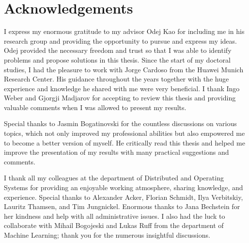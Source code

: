 

\bigskip


\begingroup

\let\clearpage\relax
\let\cleardoublepage\relax
\let\cleardoublepage\relax

\chapter*{Acknowledgements}
I express my enormous gratitude to my advisor Odej Kao for including me in his research group and providing the opportunity to pursue and express my ideas. Odej provided the necessary freedom and trust so that I was able to identify problems and propose solutions in this thesis. Since the start of my doctoral studies, I had the pleasure to work with Jorge Cardoso from the Huawei Munich Research Center. His guidance throughout the years together with the huge experience and knowledge he shared with me were very beneficial. I thank Ingo Weber and Gjorgji Madjarov for accepting to review this thesis and providing valuable comments when I was allowed to present my results.

\bigskip

Special thanks to Jasmin Bogatinovski for the countless discussions on various topics, which not only improved my professional abilities but also empowered me to become a better version of myself. He critically read this thesis and helped me improve the presentation of my results with many practical suggestions and comments. 

\bigskip

I thank all my colleagues at the department of Distributed and Operating Systems for providing an enjoyable working atmosphere, sharing knowledge, and experience. Special thanks to Alexander Acker, Florian Schmidt, Ilya Verbitskiy, Lauritz Thamsen, and Tim Jungnickel. Enormous thanks to Jana Bechstein for her kindness and help with all administrative issues. I also had the luck to collaborate with Mihail Bogojeski and Lukas Ruff from the department of Machine Learning; thank you for the numerous insightful discussions. 

